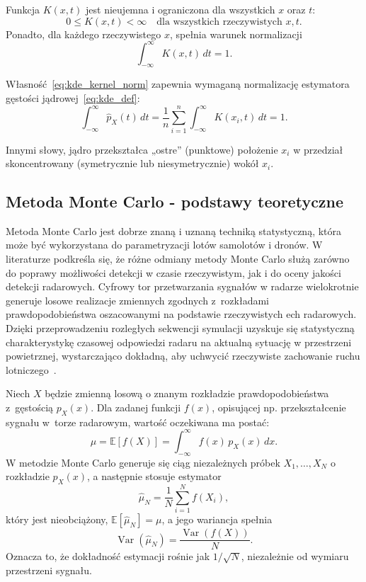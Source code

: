 Funkcja \(K(x,t)\) jest nieujemna i ograniczona dla wszystkich \(x\) oraz \(t\):
\begin{equation}
0 \le K(x,t) < \infty \quad \text{dla wszystkich rzeczywistych } x,t.
\label{eq:kde_nonnegative}
\end{equation}
Ponadto, dla każdego rzeczywistego \(x\), spełnia warunek normalizacji
\begin{equation}
\int_{-\infty}^{\infty} K(x,t)\,dt = 1.
\label{eq:kde_kernel_norm}
\end{equation}

Własność~\eqref{eq:kde_kernel_norm} zapewnia wymaganą normalizację estymatora gęstości jądrowej~\eqref{eq:kde_def}:
\begin{equation}
\int_{-\infty}^{\infty} \hat p_X(t)\,dt
= \frac{1}{n}\sum_{i=1}^{n} \int_{-\infty}^{\infty} K(x_i,t)\,dt
= 1.
\label{eq:kde_estimator_norm}
\end{equation}

Innymi słowy, jądro przekształca „ostre” (punktowe) położenie \(x_i\) w przedział skoncentrowany (symetrycznie lub niesymetrycznie) wokół \(x_i\).

\subsection{Metoda Monte Carlo - podstawy teoretyczne}
Metoda Monte Carlo jest dobrze znaną i uznaną techniką statystyczną, która może być wykorzystana do parametryzacji lotów samolotów i dronów. W literaturze podkreśla się, że różne odmiany metody Monte Carlo służą zarówno do poprawy możliwości detekcji w czasie rzeczywistym, jak i do oceny jakości detekcji radarowych. Cyfrowy tor przetwarzania sygnałów w radarze wielokrotnie generuje losowe realizacje zmiennych zgodnych z~rozkładami prawdopodobieństwa oszacowanymi na podstawie rzeczywistych ech radarowych. Dzięki przeprowadzeniu rozległych sekwencji symulacji uzyskuje się statystyczną charakterystykę czasowej odpowiedzi radaru na aktualną sytuację w przestrzeni powietrznej, wystarczająco dokładną, aby uchwycić rzeczywiste zachowanie ruchu lotniczego~\cite{Kroese2011MonteCarlo}.

Niech \(X\) będzie zmienną losową o znanym rozkładzie prawdopodobieństwa z~gęstością \(p_X(x)\). Dla zadanej funkcji \(f(x)\), opisującej np. przekształcenie sygnału w~torze radarowym, wartość oczekiwana ma postać:
\begin{equation}
\mu = \mathbb{E}[f(X)] = \int_{-\infty}^{\infty} f(x)\,p_X(x)\,dx.
\end{equation}
W metodzie Monte Carlo generuje się ciąg niezależnych próbek \(X_1,\dots,X_N\) o rozkładzie \(p_X(x)\), a następnie stosuje estymator
\begin{equation}
\hat{\mu}_N = \frac{1}{N}\sum_{i=1}^{N} f(X_i),
\end{equation}
który jest nieobciążony, \(\mathbb{E}[\hat{\mu}_N]=\mu\), a jego wariancja spełnia
\begin{equation}
\operatorname{Var}(\hat{\mu}_N) = \frac{\operatorname{Var}(f(X))}{N}.
\end{equation}
Oznacza to, że dokładność estymacji rośnie jak \(1/\sqrt{N}\), niezależnie od wymiaru przestrzeni sygnału.

